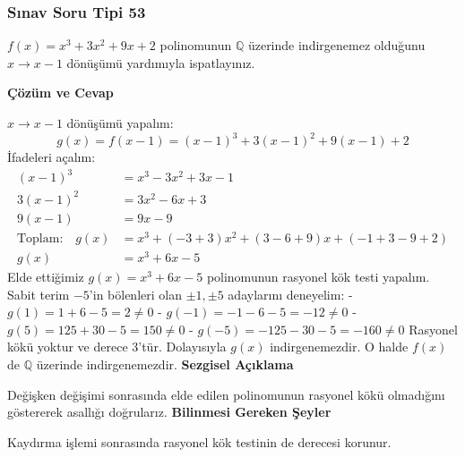 \documentclass[11pt, a4paper]{article}
\newenvironment{cozum}{
    \vspace{0.5cm}
    \noindent\textcolor{green!60!black}{\faCheckCircle\enspace \textbf{\Large Çözüm ve Cevap}}\par\vspace{0.2cm}
}{}
\newenvironment{sezgisel}{
    \vspace{0.5cm}
    \noindent\textcolor{orange!80!black}{\faLightbulb\enspace \textbf{\Large Sezgisel Açıklama}}\par\vspace{0.2cm}
    \itshape
}{}
\newenvironment{bilgi}{
    \vspace{0.5cm}
    \noindent\textcolor{red!70!black}{\faExclamationTriangle\enspace \textbf{\Large Bilinmesi Gereken Şeyler}}\par\vspace{0.2cm}
}{}
\begin{document}
\subsubsection{Sınav Soru Tipi 53}
\begin{sinavbox}
$f(x) = x^3+3x^2+9x+2$ polinomunun $\mathbb{Q}$ üzerinde indirgenemez olduğunu $x \to x-1$ dönüşümü yardımıyla ispatlayınız.
\end{sinavbox}
\begin{cozum}
$x \to x-1$ dönüşümü yapalım:
\[ g(x) = f(x-1) = (x-1)^3 + 3(x-1)^2 + 9(x-1) + 2 \]
İfadeleri açalım:
\begin{align*}
(x-1)^3 &= x^3 - 3x^2 + 3x - 1 \\
3(x-1)^2 &= 3x^2 - 6x + 3 \\
9(x-1) &= 9x - 9 \\
\text{Toplam:} \quad g(x) &= x^3 + (-3+3)x^2 + (3-6+9)x + (-1+3-9+2) \\
g(x) &= x^3 + 6x - 5
\end{align*}
Elde ettiğimiz $g(x) = x^3+6x-5$ polinomunun rasyonel kök testi yapalım.
Sabit terim $-5$'in bölenleri olan $\pm 1, \pm 5$ adaylarını deneyelim:
- $g(1) = 1+6-5 = 2 \neq 0$
- $g(-1) = -1-6-5 = -12 \neq 0$
- $g(5) = 125+30-5 = 150 \neq 0$
- $g(-5) = -125-30-5 = -160 \neq 0$
Rasyonel kökü yoktur ve derece 3'tür. Dolayısıyla $g(x)$ indirgenemezdir. O halde $f(x)$ de $\mathbb{Q}$ üzerinde indirgenemezdir.
\end{cozum}
\begin{sezgisel}
Değişken değişimi sonrasında elde edilen polinomunun rasyonel kökü olmadığını göstererek asallığı doğrularız.
\end{sezgisel}
\begin{bilgi}
Kaydırma işlemi sonrasında rasyonel kök testinin de derecesi korunur.
\end{bilgi}

\newpage
\end{document}
